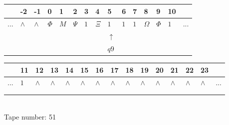 \documentclass[11pt]{article}
\begin{document}
\begin{table}[H]
\centering
\begin{tabular}{lllllllllllllll}
 & -2 & -1 & 0 & 1 & 2 & 3 & 4 & 5 & 6 & 7 & 8 & 9 & 10 & \\
\hline
$...$ & \multicolumn{1}{|l|}{$\wedge$} & \multicolumn{1}{|l|}{$\wedge$} & \multicolumn{1}{|l|}{$\Phi$} & \multicolumn{1}{|l|}{$M$} & \multicolumn{1}{|l|}{$\Psi$} & \multicolumn{1}{|l|}{$1$} & \multicolumn{1}{|l|}{$\Xi$} & \multicolumn{1}{|l|}{$1$} & \multicolumn{1}{|l|}{$1$} & \multicolumn{1}{|l|}{$1$} & \multicolumn{1}{|l|}{$\Omega$} & \multicolumn{1}{|l|}{$\Phi$} & \multicolumn{1}{|l|}{$1$} & $...$\\
\hline
&  &  &  &  &  &  &  & $\uparrow$ &  &  &  &  &  &  \\
&  &  &  &  &  &  &  & $ q9 $ &  &  &  &  &  &  \\
\end{tabular}
\begin{tabular}{lllllllllllllll}
 & 11 & 12 & 13 & 14 & 15 & 16 & 17 & 18 & 19 & 20 & 21 & 22 & 23 & \\
\hline
$...$ & \multicolumn{1}{|l|}{$1$} & \multicolumn{1}{|l|}{$\wedge$} & \multicolumn{1}{|l|}{$\wedge$} & \multicolumn{1}{|l|}{$\wedge$} & \multicolumn{1}{|l|}{$\wedge$} & \multicolumn{1}{|l|}{$\wedge$} & \multicolumn{1}{|l|}{$\wedge$} & \multicolumn{1}{|l|}{$\wedge$} & \multicolumn{1}{|l|}{$\wedge$} & \multicolumn{1}{|l|}{$\wedge$} & \multicolumn{1}{|l|}{$\wedge$} & \multicolumn{1}{|l|}{$\wedge$} & \multicolumn{1}{|l|}{$\wedge$} & $...$\\
\hline
&  &  &  &  &  &  &  &  &  &  &  &  &  &  \\
&  &  &  &  &  &  &  &  &  &  &  &  &  &  \\
\end{tabular}
\\
Tape number: 51
\noindent\makebox[\linewidth]{\hdashrule{\textwidth}{1pt}{1pt}}\end{table}
\clearpage
\end{document}
